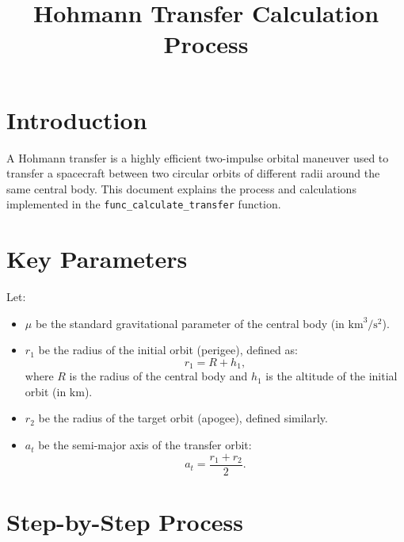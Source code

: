\documentclass[a4paper,12pt]{article}
\title{Hohmann Transfer Calculation Process}
\author{}
\date{}
\begin{document}
\maketitle

\section*{Introduction}
A Hohmann transfer is a highly efficient two-impulse orbital maneuver used to transfer a spacecraft between two circular orbits of different radii around the same central body. This document explains the process and calculations implemented in the \texttt{func\_calculate\_transfer} function.

\section*{Key Parameters}
Let:
\begin{itemize}
    \item $\mu$ be the standard gravitational parameter of the central body (in $\text{km}^3/\text{s}^2$).
    \item $r_1$ be the radius of the initial orbit (perigee), defined as:
    \begin{equation}
        r_1 = R + h_1,
    \end{equation}
    where $R$ is the radius of the central body and $h_1$ is the altitude of the initial orbit (in $\text{km}$).
    \item $r_2$ be the radius of the target orbit (apogee), defined similarly.
    \item $a_t$ be the semi-major axis of the transfer orbit:
    \begin{equation}
        a_t = \frac{r_1 + r_2}{2}.
    \end{equation}
\end{itemize}

\section*{Step-by-Step Process}
\end{document}
